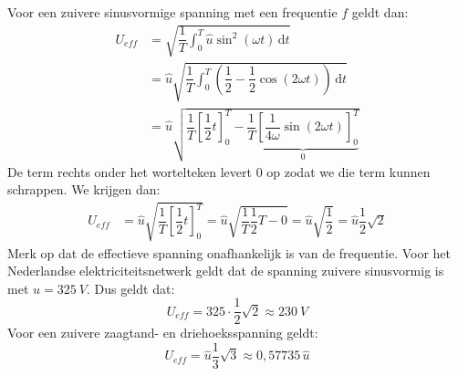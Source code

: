Voor een zuivere sinusvormige spanning met een frequentie $f$ geldt dan:
%
\begin{equation}
\begin{split}
U_{eff} &= \sqrt{\dfrac{1}{T}\int_0^T\hat{u}\sin^2(\omega t)\,\mathrm{d}t} \\
        &= \hat{u}\sqrt{\dfrac{1}{T}\int_0^T\left(\dfrac{1}{2}-\dfrac{1}{2}\cos(2\omega t)\right)\,\mathrm{d}t} \\
        &= \hat{u}\sqrt{\dfrac{1}{T}\left[\dfrac{1}{2}t\right]^T_0 - \underbrace{\dfrac{1}{T}\left[\dfrac{1}{4\omega}\sin(2\omega t)\right]^T_0}_0}
\end{split}
\end{equation}
%
De term rechts onder het wortelteken levert 0 op zodat we die term kunnen schrappen. We krijgen dan:
%
\begin{equation}
\begin{split}
U_{eff} &= \hat{u}\sqrt{\dfrac{1}{T}\left[\dfrac{1}{2}t\right]^T_0}
      = \hat{u}\sqrt{\dfrac{1}{T}\dfrac{1}{2}T - 0}
      = \hat{u}\sqrt{\dfrac{1}{2}}
      = \hat{u}\dfrac{1}{2}\sqrt{2}
\end{split}\end{equation}
%
Merk op dat de effectieve spanning onafhankelijk is van de frequentie. Voor het Nederlandse elektriciteitsnetwerk geldt dat de spanning zuivere sinusvormig is met $\hat{u}=\SI{325}{V}$. Dus geldt dat:
%
\begin{equation}
U_{eff} = 325\cdot\dfrac{1}{2}\sqrt{2} \approx \SI{230}{V}
\end{equation}
%
Voor een zuivere zaagtand- en driehoeksspanning geldt:
%
\begin{equation}
U_{eff} =  \hat{u}\dfrac{1}{3}\sqrt{3} \approx 0,57735\, \hat{u}
\end{equation}
